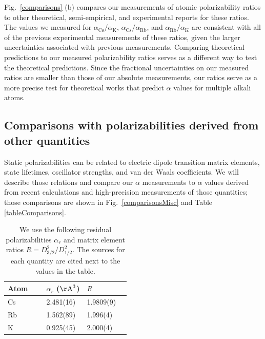 \documentclass[twocolumn,pra,showpacs,superscriptaddress,longbibliography]{revtex4-1}   %
\newcommand{\figref}[1]{Fig.~\ref{#1}}
\newcommand{\ak}{\alpha_{\textrm{K}}}
\newcommand{\arb}{\alpha_{\textrm{Rb}}}
\newcommand{\acs}{\alpha_{\textrm{Cs}}}
\newcommand{\AAA}{\mathrm{\AA}}
\begin{document}
\figref{comparisons} (b) compares our measurements of atomic polarizability ratios to other theoretical, semi-empirical, and experimental reports for these ratios.  The values we measured for $\acs/\ak$, $\acs/\arb$, and $\arb/\ak$ are consistent with all of the previous experimental measurements of these ratios, given the larger uncertainties associated with previous measurements.  Comparing theoretical predictions to our measured polarizability ratios serves as a different way to test the theoretical predictions.  Since the fractional uncertainties on our measured ratios are smaller than those of our absolute measurements, our ratios serve as a more precise test for theoretical works that predict $\alpha$ values for multiple alkali atoms.  




\subsection{Comparisons with polarizabilities derived from other quantities} \label{sectionComparisonsWithDerived}

Static polarizabilities can be related to electric dipole transition matrix elements, state lifetimes, oscillator strengths, and van der Waals coefficients. We will describe those relations and compare our $\alpha$ measurements to $\alpha$ values derived from recent calculations and high-precision measurements of those quantities; those comparisons are shown in \figref{comparisonsMisc} and Table \ref{tableComparisons}.

\begingroup
\begin{table}
\caption{\label{tableOmegaRes}We use the following residual polarizabilities $\alpha_r$ and matrix element ratios $R = D_{3/2}^2/D_{1/2}^2$.
The sources for each quantity are cited next to the values in the table.}
\begin{center}
\begin{tabular}{llll}
\hline\hline
Atom$\quad$~ & $\alpha_r$ ($\AAA^3$) \quad\quad\quad\quad\quad & $R$ \\
\hline
Cs & 2.481(16) \cite{Derevianko2001} & 1.9809(9) & \cite{Rafac1998} \\
Rb & 1.562(89) \cite{Safronova2006} & 1.996(4) & \cite{Volz2006} \\ %
K  & 0.925(45) \cite{Safronova2006} & 2.000(4) & \cite{Holmgren2012} \\
\hline\hline
\end{tabular}
\end{center}
\end{table}
\endgroup
\end{document}
